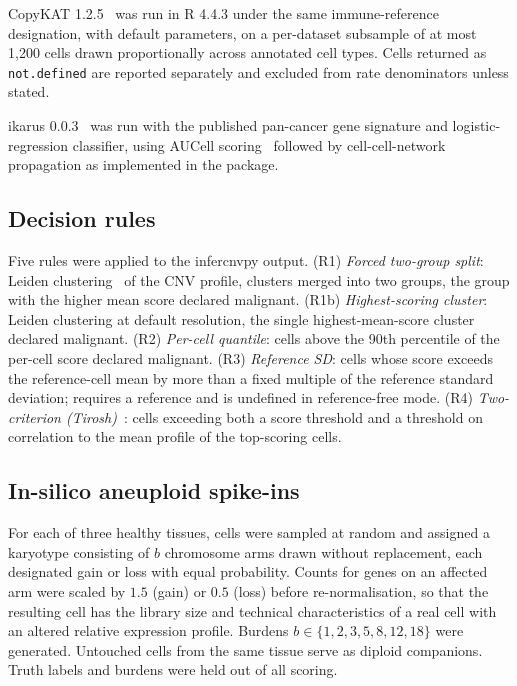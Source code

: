 \documentclass[11pt]{article}
\begin{document}
CopyKAT 1.2.5~\cite{copykat} was run in R 4.4.3 under the same immune-reference
designation, with default parameters, on a per-dataset subsample of at most
1{,}200 cells drawn proportionally across annotated cell types. Cells
returned as \texttt{not.defined} are reported separately and excluded from
rate denominators unless stated.

ikarus 0.0.3~\cite{ikarus} was run with the published pan-cancer gene
signature and logistic-regression classifier, using AUCell
scoring~\cite{aucell} followed by
cell-cell-network propagation as implemented in the package.

\subsection{Decision rules}

Five rules were applied to the infercnvpy output.
(R1) \emph{Forced two-group split}: Leiden clustering~\cite{leiden} of the
CNV profile,
clusters merged into two groups, the group with the higher mean score
declared malignant.
(R1b) \emph{Highest-scoring cluster}: Leiden clustering at default
resolution, the single highest-mean-score cluster declared malignant.
(R2) \emph{Per-cell quantile}: cells above the 90th percentile of the
per-cell score declared malignant.
(R3) \emph{Reference SD}: cells whose score exceeds the reference-cell mean
by more than a fixed multiple of the reference standard deviation; requires a
reference and is undefined in reference-free mode.
(R4) \emph{Two-criterion (Tirosh)}~\cite{tirosh2016,puram2017}: cells
exceeding both a score threshold
and a threshold on correlation to the mean profile of the top-scoring cells.

\subsection{In-silico aneuploid spike-ins}

For each of three healthy tissues, cells were sampled at random and assigned
a karyotype consisting of $b$ chromosome arms drawn without replacement, each
designated gain or loss with equal probability. Counts for genes on an
affected arm were scaled by $1.5$ (gain) or $0.5$ (loss) before
re-normalisation, so that the resulting cell has the library size and
technical characteristics of a real cell with an altered relative expression
profile. Burdens $b \in \{1,2,3,5,8,12,18\}$ were generated. Untouched cells
from the same tissue serve as diploid companions. Truth labels and burdens
were held out of all scoring.
\end{document}
